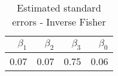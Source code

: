\begin{table}[ht]
\centering
\begin{tabular}{rrrr}
  \hline
$\beta_1$ & $\beta_2$ & $\beta_3$ & $\beta_0$ \\ 
  \hline
0.07 & 0.07 & 0.75 & 0.06 \\ 
   \hline
\end{tabular}
\caption{Estimated standard errors - Inverse Fisher} 
\label{tab:normalAvar}
\end{table}
